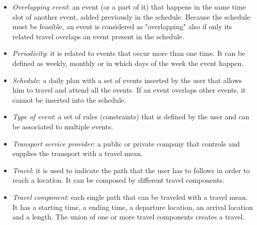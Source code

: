 \begin{itemize}
	\item \textit{Overlapping event}: an event (or a part of it) that happens in the same time slot of another event, added previously in the schedule. Because the schedule must be feasible, an event is considered as "overlapping" also if only its related travel overlaps an event present in the schedule.
	\item \textit{Periodicity}: it is related to events that occur more than one time. It can be defined as weekly, monthly or in which days of the week the event happen.
	\item \textit{Schedule}: a daily plan with a set of events inserted by the user that allows him to travel and attend all the events. If an event overlaps other events, it cannot be inserted into the schedule. 
	\item \textit{Type of event}: a set of rules (constraints) that is defined by the user and can be associated to multiple events.
	\item \textit{Transport service provider}: a public or private company that controls and supplies the transport with a travel mean. 
	\item \textit{Travel}: it is used to indicate the path that the user has to follows in order to reach a location. It can be composed by different travel components.
	\item \textit{Travel component}: each single path that can be traveled with a travel mean. It has a starting time, a ending time, a departure location, an arrival location and a length. The union of one or more travel components creates a travel.
	\end{itemize}